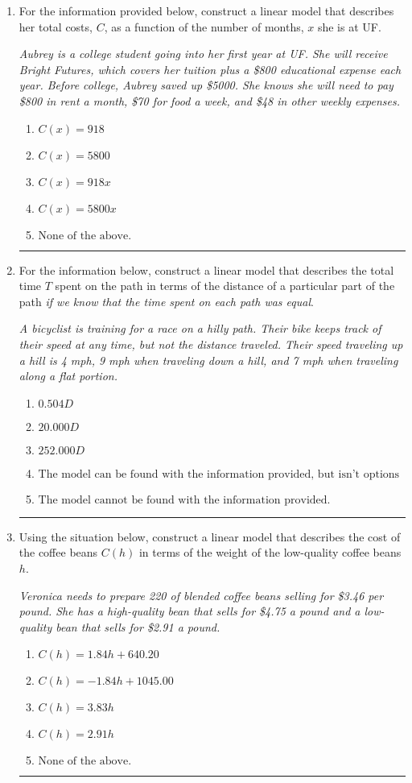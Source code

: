 \documentclass[14pt]{extbook}
\newcommand{\litem}[1]{\item#1\hspace*{-1cm}\rule{\textwidth}{0.4pt}}
\begin{document}
\begin{enumerate}
\litem{
For the information provided below, construct a linear model that describes her total costs, $C$, as a function of the number of months, $x$ she is at UF. 
\begin{center}
    \textit{ Aubrey is a college student going into her first year at UF. She will receive Bright Futures, which covers her tuition plus a \$800 educational expense each year. Before college, Aubrey saved up \$5000. She knows she will need to pay \$800 in rent a month, \$70 for food a week, and \$48 in other weekly expenses. }
\end{center}
\begin{enumerate}[label=\Alph*.]
\item \( C(x) = 918 \)
\item \( C(x) = 5800 \)
\item \( C(x) = 918 x \)
\item \( C(x) = 5800 x \)
\item \( \text{None of the above.} \)

\end{enumerate} }
\litem{
For the information below, construct a linear model that describes the total time $T$ spent on the path in terms of the distance of a particular part of the path \textit{if we know that the time spent on each path was equal}.
\begin{center}
    \textit{ A bicyclist is training for a race on a hilly path. Their bike keeps track of their speed at any time, but not the distance traveled. Their speed traveling up a hill is 4 mph, 9 mph when traveling down a hill, and 7 mph when traveling along a flat portion. }
\end{center}
\begin{enumerate}[label=\Alph*.]
\item \( 0.504 D \)
\item \( 20.000 D \)
\item \( 252.000 D \)
\item \( \text{The model can be found with the information provided, but isn't options 1-3.} \)
\item \( \text{The model cannot be found with the information provided.} \)

\end{enumerate} }
\litem{
Using the situation below, construct a linear model that describes the cost of the coffee beans $C(h)$ in terms of the weight of the low-quality coffee beans $h$.
\begin{center}
    \textit{ Veronica needs to prepare 220 of blended coffee beans selling for \$3.46 per pound. She has a high-quality bean that sells for \$4.75 a pound and a low-quality bean that sells for \$2.91 a pound. }
\end{center}
\begin{enumerate}[label=\Alph*.]
\item \( C(h) = 1.84 h + 640.20 \)
\item \( C(h) = -1.84 h + 1045.00 \)
\item \( C(h) = 3.83 h \)
\item \( C(h) = 2.91 h \)
\item \( \text{None of the above.} \)


\end{enumerate}}
\end{enumerate}
\end{document}

